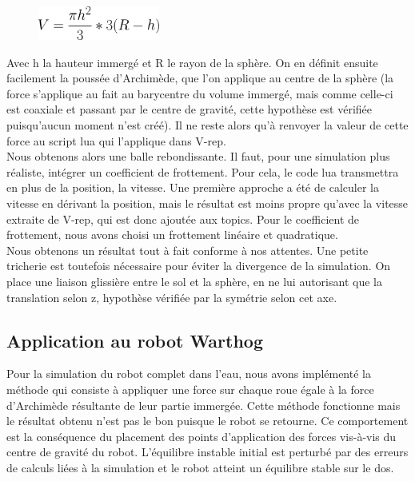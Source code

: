 \documentclass[12pt, openany]{report}
\begin{document}
\begin{figure}[H]
     \centering
     \includegraphics[width=4cm]{form_cal_sph.png}
\end{figure}
Avec h la hauteur immergé et R le rayon de la sphère. On en définit ensuite facilement la poussée d'Archimède, que l'on applique au centre de la sphère (la force s'applique au fait au barycentre du volume immergé, mais comme celle-ci est coaxiale et passant par le centre de gravité, cette hypothèse est vérifiée puisqu'aucun moment n'est créé). Il ne reste alors qu'à renvoyer la valeur de cette force au script lua qui l'applique dans V-rep.\\

Nous obtenons alors une balle rebondissante. Il faut, pour une simulation plus réaliste, intégrer un coefficient de frottement. Pour cela, le code lua transmettra en plus de la position, la vitesse. Une première approche a été de calculer la vitesse en dérivant la position, mais le résultat est moins propre qu'avec la vitesse extraite de V-rep, qui est donc ajoutée aux topics. Pour le coefficient de frottement, nous avons choisi un frottement linéaire et quadratique.\\

Nous obtenons un résultat tout à fait conforme à nos attentes. Une petite tricherie est toutefois nécessaire pour éviter la divergence de la simulation. On place une liaison glissière entre le sol et la sphère, en ne lui autorisant que la translation selon z, hypothèse vérifiée par la symétrie selon cet axe.

\subsection{Application au robot Warthog}
Pour la simulation du robot complet dans l'eau, nous avons implémenté la méthode qui consiste à appliquer une force sur chaque roue égale à la force d'Archimède résultante de leur partie immergée. Cette méthode fonctionne mais le résultat obtenu n'est pas le bon puisque le robot se retourne. Ce comportement est la conséquence du placement des points d'application des forces vis-à-vis du centre de gravité du robot. L'équilibre instable initial est perturbé par des erreurs de calculs liées à la simulation et le robot atteint un équilibre stable sur le dos.\\
\end{document}
